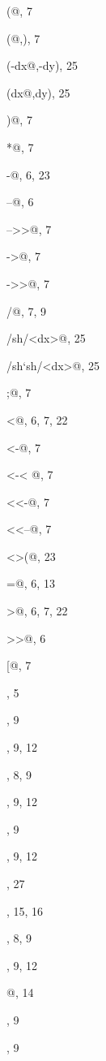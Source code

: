 \documentclass[12pt]{article}
\begin{document}
{\begin{theindex}
  \item \verb@%@, 3
  \item \verb@(@, 7
  \item \verb@(@,), 7
  \item \verb@(-dx@,-dy), 25
  \item \verb@(dx@,dy), 25
  \item \verb@)@, 7
  \item \verb@*@, 7
  \item \verb@-@, 6, 23
  \item \verb@--@, 6
  \item \verb@-->>@, 7
  \item \verb@->@, 7
  \item \verb@->>@, 7
  \item \verb@/@, 7, 9
  \item \verb@/{sh}/<dx>@, 25
  \item \verb@/{sh}`{sh}/<dx>@, 25
  \item \verb@;@, 7
  \item \verb@<@, 6, 7, 22
  \item \verb@<-@, 7
  \item \verb@<-< @, 7
  \item \verb@<<-@, 7
  \item \verb@<<--@, 7
  \item \verb@<>(@, 23
  \item \verb@=@, 6, 13
  \item \verb@>@, 6, 7, 22
  \item \verb@>>@, 6
  \item \verb@[@, 7
  \item \verb@\startsection@, 5
  \item \verb@\Atriangle@, 9
  \item \verb@\Atrianglepair@, 9, 12
  \item \verb@\Ctriangle@, 8, 9
  \item \verb@\Ctrianglepair@, 9, 12
  \item \verb@\Dtriangle@, 9
  \item \verb@\Dtrianglepair@, 9, 12
  \item \verb@\POS@, 27
  \item \verb@\Square@, 15, 16
  \item \verb@\Vtriangle@, 8, 9
  \item \verb@\Vtrianglepair@, 9, 12
  \item \verb@{-}@, 14
  \item \verb@\bfig@, 9
  \item \verb@\btriangle@, 9

\end{theindex}}
\end{document}
